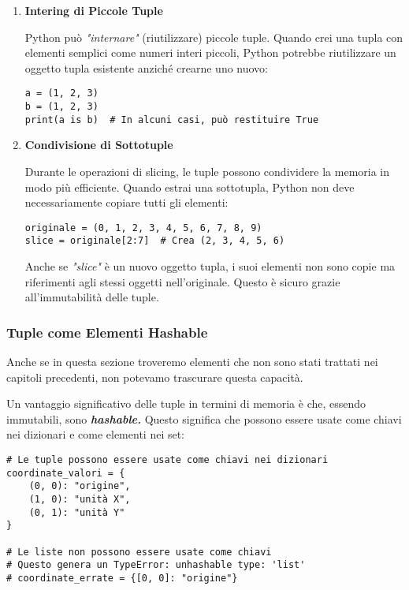 \begin{enumerate}
    \item \textbf{Intering di Piccole Tuple}
    
        Python può \textit{"internare"} (riutilizzare) piccole tuple. Quando crei una tupla con elementi semplici come numeri interi piccoli, Python potrebbe riutilizzare un oggetto tupla esistente anziché crearne uno nuovo:
        \begin{lstlisting}
a = (1, 2, 3)
b = (1, 2, 3)
print(a is b)  # In alcuni casi, può restituire True
\end{lstlisting}

    \item \textbf{Condivisione di Sottotuple}

        Durante le operazioni di slicing, le tuple possono condividere la memoria in modo più efficiente. Quando estrai una sottotupla, Python non deve necessariamente copiare tutti gli elementi:

\begin{lstlisting}
originale = (0, 1, 2, 3, 4, 5, 6, 7, 8, 9)
slice = originale[2:7]  # Crea (2, 3, 4, 5, 6)
\end{lstlisting}

Anche se \textit{"slice"} è un nuovo oggetto tupla, i suoi elementi non sono copie ma riferimenti agli stessi oggetti nell'originale. Questo è sicuro grazie all'immutabilità delle tuple.
\end{enumerate}

\subsubsection{Tuple come Elementi Hashable}

Anche se in questa sezione troveremo elementi che non sono stati trattati nei capitoli precedenti, non potevamo trascurare questa capacità.



Un vantaggio significativo delle tuple in termini di memoria è che, essendo immutabili, sono \textit{\textbf{hashable.}} Questo significa che possono essere usate come chiavi nei dizionari e come elementi nei set:

\begin{lstlisting}
# Le tuple possono essere usate come chiavi nei dizionari
coordinate_valori = {
    (0, 0): "origine",
    (1, 0): "unità X",
    (0, 1): "unità Y"
}

# Le liste non possono essere usate come chiavi
# Questo genera un TypeError: unhashable type: 'list'
# coordinate_errate = {[0, 0]: "origine"}
\end{lstlisting}

